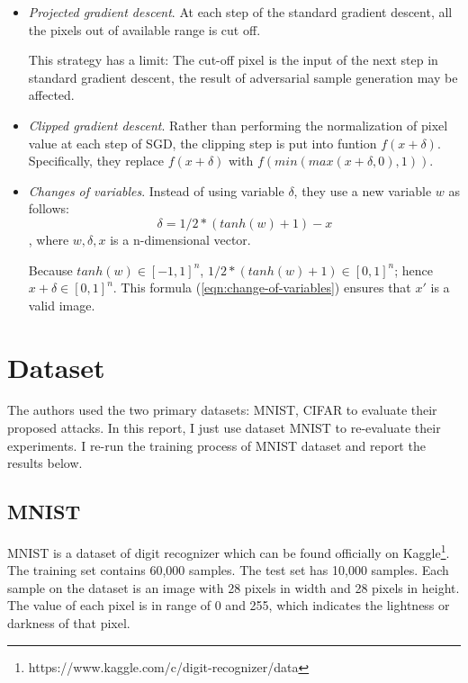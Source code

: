 \documentclass[12pt]{article}
\begin{document}
\begin{itemize}
	\item \textit{Projected gradient descent}. At each step of the standard gradient descent, all the pixels out of available range is cut off. 
	
	This strategy has a limit: The cut-off pixel is the input of the next step in standard gradient descent, the result of adversarial sample generation may be affected.
	
	\item \textit{Clipped gradient descent}. Rather than performing the normalization of pixel value at each step of SGD, the clipping step is put into funtion $f(x+\delta)$. Specifically, they replace $f(x+\delta)$ with $f(min(max(x+\delta, 0), 1))$.
	
	
	\item \textit{Changes of variables}. Instead of using variable $\delta$, they use a new variable $w$ as follows:
	\begin{equation}
	\delta = 1/2 * (tanh(w) + 1) - x \label{eqn:change-of-variables}
	\end{equation},
	where $w, \delta, x$ is a n-dimensional vector.
	
	Because $tanh(w) \in [-1, 1]^n$, $1/2 * (tanh(w) + 1) \in [0, 1]^n$; hence $x + \delta \in [0,1]^n$. This formula (\ref{eqn:change-of-variables}) ensures that $x'$ is a valid image. 
\end{itemize}

\section{Dataset}

The authors used the two primary datasets: MNIST, CIFAR to evaluate their proposed attacks. In this report, I just use dataset MNIST to re-evaluate their experiments. I re-run the training process of MNIST dataset and report the results below.

\subsection{MNIST}
MNIST is a dataset of digit recognizer which can be found officially on Kaggle\footnote{https://www.kaggle.com/c/digit-recognizer/data}. The training set contains 60,000 samples. The test set has 10,000 samples.  Each sample on the dataset is an image with 28 pixels in width and 28 pixels in height. The value of each pixel is in range of 0 and 255, which indicates the lightness or darkness of that pixel.
\end{document}
